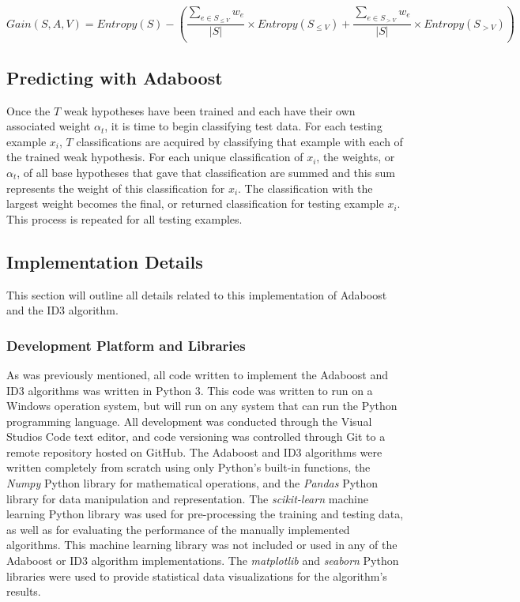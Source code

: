 \documentclass[a4paper]{article}
\begin{document}
\begin{equation}
    \label{eq:weighted-info-gain}
    Gain(S, A, V) = Entropy(S) - \left(\frac{\sum_{e \in S_{\le V}}w_e}{|S|}\times Entropy(S_{\le V}) + \frac{\sum_{e \in S_{> V}}w_e}{|S|}\times Entropy(S_{> V}) \right)
\end{equation}

\subsection{Predicting with Adaboost}
Once the $T$ weak hypotheses have been trained and each have their own associated weight $\alpha_t$, it is time to begin classifying test data. For each testing example $x_i$, $T$ classifications are acquired by classifying that example with each of the trained weak hypothesis. For each unique classification of $x_i$, the weights, or $\alpha_t$, of all base hypotheses that gave that classification are summed and this sum represents the weight of this classification for $x_i$. The classification with the largest weight becomes the final, or returned classification for testing example $x_i$. This process is repeated for all testing examples.

\subsection{Implementation Details}
This section will outline all details related to this implementation of Adaboost and the ID3 algorithm.

\subsubsection{Development Platform and Libraries}
As was previously mentioned, all code written to implement the Adaboost and ID3 algorithms was written in Python 3. This code was written to run on a Windows operation system, but will run on any system that can run the Python programming language. All development was conducted through the Visual Studios Code text editor, and code versioning was controlled through Git to a remote repository hosted on GitHub. The Adaboost and ID3 algorithms were written completely from scratch using only Python's built-in functions, the \textit{Numpy} Python library for mathematical operations, and the \textit{Pandas} Python library for data manipulation and representation. The \textit{scikit-learn} machine learning Python library was used for pre-processing the training and testing data, as well as for evaluating the performance of the manually implemented algorithms. This machine learning library was not included or used in any of the Adaboost or ID3 algorithm implementations. The \textit{matplotlib} and \textit{seaborn} Python libraries were used to provide statistical data visualizations for the algorithm's results.
\end{document}
